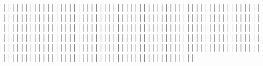 |    |
|    |
|    |
|    |
|    |
|    |
|    |
|    |
|    |
|    |
|    |
|    |
|    |
|    |
|    |
|    |
|    |
|    |
|    |
|    |
|    |
|    |
|    |
|    |
|    |
|    |
|    |
|    |
|    |
|    |
|    |
|    |
|    |
|    |
|    |
|    |
|    |
|    |
|    |
|    |
|    |
|    |
|    |
|    |
|    |
|    |
|    |
|    |
|    |
|    |
|    |
|    |
|    |
|    |
|    |
|    |
|    |
|    |
|    |
|    |
|    |
|    |
|    |
|    |
|    |
|    |
|    |
|    |
|    |
|    |
|    |
|    |
|    |
|    |
|    |
|    |
|    |
|    |
|    |
|    |
|    |
|    |
|    |
|    |
|    |
|    |
|    |
|    |
|    |
|    |
|    |
|    |
|    |
|    |
|    |
|    |
|    |
|    |
|    |
|    |
|    |
|    |
|    |
|    |
|    |
|    |
|    |
|    |
|    |
|    |
|    |
|    |
|    |
|    |
|    |
|    |
|    |
|    |
|    |
|    |
|    |
|    |
|    |
|    |
|    |
|    |
|    |
|    |
|    |
|    |
|    |
|    |
|    |
|    |
|    |
|    |
|    |
|    |
|    |
|    |
|    |
|    |
|    |
|    |
|    |
|    |
|    |
|    |
|    |
|    |
|    |
|    |
|    |
|    |
|    |
|    |
|    |
|    |
|    |
|    |
|    |
|    |
|    |
|    |
|    |
|    |
|    |
|    |
|    |
|